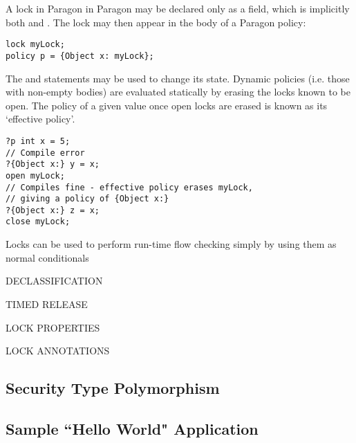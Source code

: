 A lock in Paragon in Paragon may be declared only as a field, which is implicitly both  and . The lock may then appear in the body of a Paragon policy:

\begin{verbatim}
lock myLock;
policy p = {Object x: myLock};
\end{verbatim}

The  and  statements may be used to change its state. Dynamic policies (i.e. those with non-empty bodies) are evaluated statically by erasing the locks known to be open. The policy of a given value once open locks are erased is known as its `effective policy'.

\begin{verbatim}
?p int x = 5;
// Compile error
?{Object x:} y = x;
open myLock;
// Compiles fine - effective policy erases myLock,
// giving a policy of {Object x:}
?{Object x:} z = x;
close myLock;
\end{verbatim}

Locks can be used to perform run-time flow checking simply by using them as normal conditionals

DECLASSIFICATION

TIMED RELEASE

LOCK PROPERTIES

LOCK ANNOTATIONS

\subsection{Security Type Polymorphism} \label{para_generics}

\subsection{Sample ``Hello World" Application}
